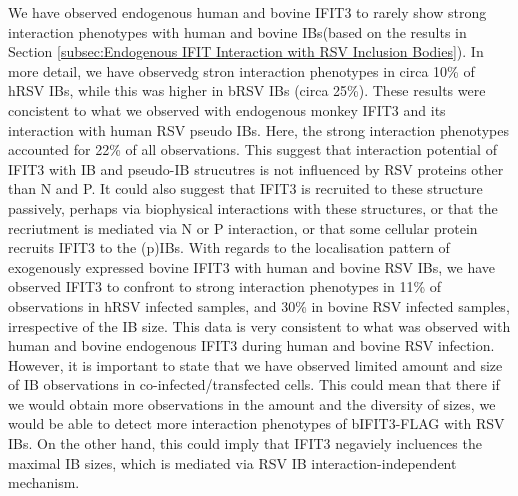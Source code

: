 We have observed endogenous human and bovine IFIT3 to rarely show strong interaction phenotypes with human and bovine IBs(based on the results in Section \ref{subsec:Endogenous IFIT Interaction with RSV Inclusion Bodies}). In more detail, we have observedg stron interaction phenotypes in circa 10\% of hRSV IBs, while this was higher in bRSV IBs (circa 25\%). These results were concistent to what we observed with endogenous monkey IFIT3 and its interaction with human RSV pseudo IBs. Here, the strong interaction phenotypes accounted for 22\% of all observations. This suggest that interaction potential of IFIT3 with IB and pseudo-IB strucutres is not influenced by RSV proteins other than N and P. It could also suggest that IFIT3 is recruited to these structure passively, perhaps via biophysical interactions with these structures, or that the recriutment is mediated via N or P interaction, or that some cellular protein recruits IFIT3 to the (p)IBs. With regards to the localisation pattern of exogenously expressed bovine IFIT3 with human and bovine RSV IBs, we have observed IFIT3 to confront to strong interaction phenotypes in 11\% of observations in hRSV infected samples, and 30\% in bovine RSV infected samples, irrespective of the IB size. This data is very consistent to what was observed with human and bovine endogenous IFIT3 during human and bovine RSV infection. However, it is important to state that we have observed limited amount and size of IB observations in co-infected/transfected cells. This could mean that there if we would obtain more observations in the amount and the diversity of sizes, we would be able to detect more interaction phenotypes of bIFIT3-FLAG with RSV IBs. On the other hand, this could imply that IFIT3 negaviely incluences the maximal IB sizes, which is mediated via RSV IB interaction-independent mechanism.

